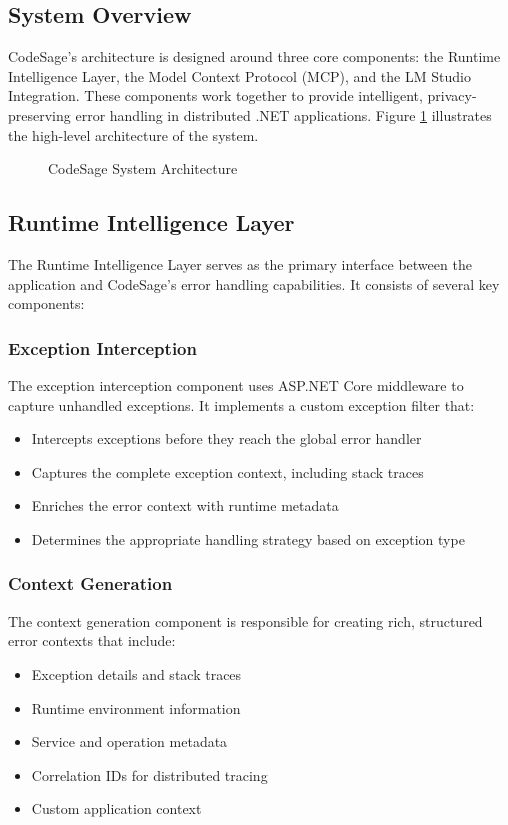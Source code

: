 \subsection{System Overview}
CodeSage's architecture is designed around three core components: the Runtime Intelligence Layer, the Model Context Protocol (MCP), and the LM Studio Integration. These components work together to provide intelligent, privacy-preserving error handling in distributed .NET applications. Figure \ref{fig:architecture} illustrates the high-level architecture of the system.

\begin{figure}[!t]
\centering
\caption{CodeSage System Architecture}
\label{fig:architecture}
\end{figure}

\subsection{Runtime Intelligence Layer}
The Runtime Intelligence Layer serves as the primary interface between the application and CodeSage's error handling capabilities. It consists of several key components:

\subsubsection{Exception Interception}
The exception interception component uses ASP.NET Core middleware to capture unhandled exceptions. It implements a custom exception filter that:

\begin{itemize}
    \item Intercepts exceptions before they reach the global error handler
    \item Captures the complete exception context, including stack traces
    \item Enriches the error context with runtime metadata
    \item Determines the appropriate handling strategy based on exception type
\end{itemize}

\subsubsection{Context Generation}
The context generation component is responsible for creating rich, structured error contexts that include:

\begin{itemize}
    \item Exception details and stack traces
    \item Runtime environment information
    \item Service and operation metadata
    \item Correlation IDs for distributed tracing
    \item Custom application context
\end{itemize}


